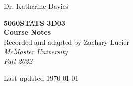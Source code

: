 \documentclass[12pt,notitlepage]{article}
\makeatletter
\theoremstyle{theoremc}
\numberwithin{amstheorem}{section}
\numberwithin{amsdefinition}{section}
\numberwithin{amsexample}{section}
\newcommand\HUGE{\@setfontsize\Huge{50}{60}}
\makeatother
\begin{document}
\AddToShipoutPicture*{\bgpic}

\begin{titlepage} %

    \raggedleft %
    
    \vspace*{\baselineskip} %
    
    
    {\Large Dr. Katherine Davies} %
    
    \vspace*{0.167\textheight} %
    
    
    \textbf{\color{main}\HUGE STATS 3D03}\\[\baselineskip]
    \textbf{\color{main}\Huge Course Notes}\\[\baselineskip]

    {\Large Recorded and adapted by Zachary Lucier}\\[1.5\baselineskip]
    
    {\Large \textit{McMaster University}}\\[0.5\baselineskip]
    {\Large \textit{Fall 2022}}

    \vspace*{0.167\textheight}

    Last updated \today
    
    
    
    

\end{titlepage}

\tableofcontents



\break


\end{document}
